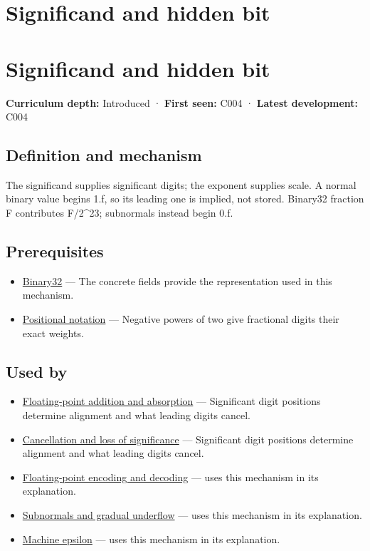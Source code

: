 \hypertarget{appendix-a24fd710cf67}{}
\section*{Significand and hidden bit}
\section{Significand and hidden bit}\label{significand-and-hidden-bit}

\textbf{Curriculum depth:} Introduced · \textbf{First seen:} C004 · \textbf{Latest development:} C004

\subsection{Definition and mechanism}\label{definition-and-mechanism}

The significand supplies significant digits; the exponent supplies scale. A normal binary value begins 1.f, so its leading one is implied, not stored. Binary32 fraction F contributes F/2\^{}23; subnormals instead begin 0.f.

\subsection{Prerequisites}\label{prerequisites}

\begin{itemize}
\tightlist
\item
  \hyperref[appendix-5057f9ad327f]{Binary32} --- The concrete fields provide the representation used in this mechanism.
\item
  \hyperref[appendix-83c3f28f7bda]{Positional notation} --- Negative powers of two give fractional digits their exact weights.
\end{itemize}

\subsection{Used by}\label{used-by}

\begin{itemize}
\item
  \hyperref[appendix-a1b1b4580dfd]{Floating-point addition and absorption} --- Significant digit positions determine alignment and what leading digits cancel.
\item
  \hyperref[appendix-a2773a6a2f9d]{Cancellation and loss of significance} --- Significant digit positions determine alignment and what leading digits cancel.
\item
  \hyperref[appendix-6854d0e2218e]{Floating-point encoding and decoding} --- uses this mechanism in its explanation.
\item
  \hyperref[appendix-00a6e044c437]{Subnormals and gradual underflow} --- uses this mechanism in its explanation.
\item
  \hyperref[appendix-390ea641da54]{Machine epsilon} --- uses this mechanism in its explanation.
\end{itemize}

